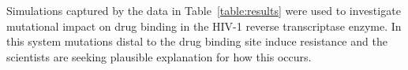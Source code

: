 \documentclass{sig-alternate}
\begin{document}












Simulations captured by the data in Table~\ref{table:results} were
used to investigate mutational impact on drug binding in the HIV-1
reverse transcriptase enzyme. In this system mutations distal to the
drug binding site induce resistance and the scientists are seeking
plausible explanation for how this occurs.
\end{document}
